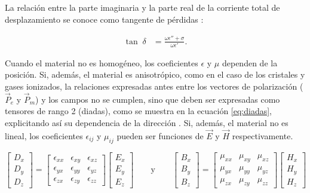 La relación entre la parte imaginaria y la parte real de la corriente total de desplazamiento se conoce como tangente de pérdidas \cite{Pozar:MwEngineering}:

\begin{align}
	\label{eq:tan_perdidas}
	\tan \; \delta &= \frac{\omega \epsilon'' + \sigma}{\omega \epsilon'}.
\end{align}

Cuando el material no es homogéneo, los coeficientes $\epsilon$ y $\mu$ dependen de la posición. Si, además, el material es anisotrópico, como en el caso de los cristales y gases ionizados, la relaciones expresadas antes entre los vectores de polarización ($\vec{P}_e$ y $\vec{P}_m$) y los campos no se cumplen, sino que deben ser expresadas como tensores de rango 2 (diadas), como se muestra en la ecuación \ref{eq:diadas}, explicitando así su dependencia de la dirección \cite{Collin:GuidedWaves}. Si, además, el material no es lineal, los coeficientes $\epsilon_{ij}$ y $\mu_{ij}$ pueden ser funciones de $\vec{E}$ y $\vec{H}$ respectivamente.

\begin{equation} \label{eq:diadas}
\begin{bmatrix}
D_x \\
D_y \\
D_z
\end{bmatrix}
=
\begin{bmatrix}
\epsilon_{xx} & \epsilon_{xy} & \epsilon_{xz} \\
\epsilon_{yx} & \epsilon_{yy} & \epsilon_{yz} \\
\epsilon_{zx} & \epsilon_{zy} & \epsilon_{zz}
\end{bmatrix}
\begin{bmatrix}
E_x \\
E_y \\
E_z
\end{bmatrix}
\qquad\text{y}\qquad
\begin{bmatrix}
B_x \\
B_y \\
B_z
\end{bmatrix}
=
\begin{bmatrix}
\mu_{xx} & \mu_{xy} & \mu_{xz} \\
\mu_{yx} & \mu_{yy} & \mu_{yz} \\
\mu_{zx} & \mu_{zy} & \mu_{zz}
\end{bmatrix}
\begin{bmatrix}
H_x \\
H_y \\
H_z
\end{bmatrix}
\end{equation}

